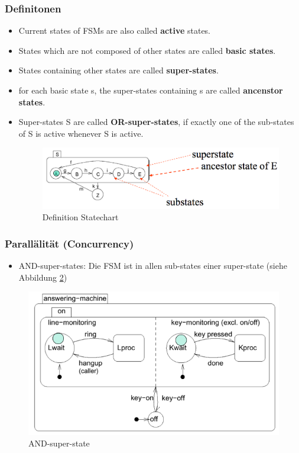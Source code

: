 {\subsubsection{Definitonen}
\begin{itemize}
  \item Current states of FSMs are also called \textbf{active} states.
  \item States which are not composed of other states are called \textbf{basic
  states}.
  \item States containing other states are called \textbf{super-states}.
  \item for each basic state s, the super-states containing s are called
  \textbf{ancenstor states}.
  \item Super-states S are called \textbf{OR-super-states}, if exactly one of
  the sub-states of S is active whenever S is active.
\begin{figure}[h]
  \centering
  {\includegraphics[scale = 0.3]{images/FSM/definition_statechart}  
  \caption{Definition Statechart}
  \label{fig:definition_statechart}}
\end{figure} 
\end{itemize}
\subsubsection{Parallälität (Concurrency)}
\begin{itemize}
  \item AND-super-states: Die FSM ist in allen sub-states einer super-state (siehe Abbildung \ref{fig:AND_super_state})
\end{itemize}
\begin{figure}[h]
  \centering
  {\includegraphics[scale = 0.4]{images/FSM/AND_super_state}  
  \caption{AND-super-state}
  \label{fig:AND_super_state}}
\end{figure} 

}
